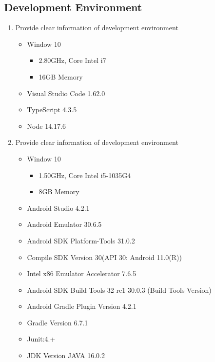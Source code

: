 \documentclass[conference]{IEEEtran}
\begin{document}
\subsection{Development Environment}
    \begin{enumerate}
        \item Provide clear information of development environment
        \begin{itemize}
            \item Window 10
            \begin{itemize}
                \item 2.80GHz, Core Intel i7
                \item 16GB Memory
            \end{itemize}
            \item Visual Studio Code 1.62.0
            \item TypeScript 4.3.5
            \item Node 14.17.6
        \end{itemize}
        \item Provide clear information of development environment
        \begin{itemize}
            \item Window 10
            \begin{itemize}
                \item 1.50GHz, Core Intel i5-1035G4
                \item 8GB Memory
            \end{itemize}
            \item Android Studio 4.2.1
            \item Android Emulator 30.6.5
            \item Android SDK Platform-Tools 31.0.2
            \item Compile SDK Version 30(API 30: Android 11.0(R))
            \item Intel x86 Emulator Accelerator 7.6.5
            \item Android SDK Build-Tools 32-rc1 30.0.3 (Build Tools Version)
            \item Android Gradle Plugin Version 4.2.1
            \item Gradle Version 6.7.1
            \item Junit:4.+
            \item JDK Version JAVA 16.0.2
        \end{itemize}
    \end{enumerate}
\end{document}
